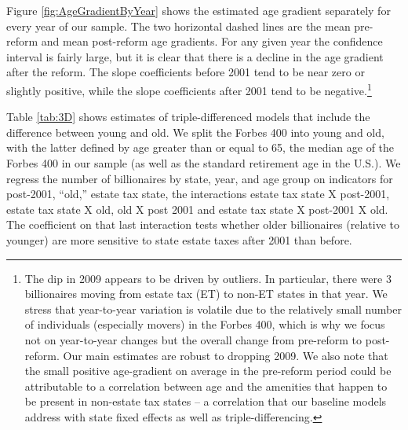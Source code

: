 \documentclass[12pt]{article}
\begin{document}
Figure \ref{fig:AgeGradientByYear} shows the estimated age gradient separately for every year of our sample. The two horizontal dashed lines are the mean pre-reform and mean post-reform age gradients.  
For any given year the confidence interval is fairly large, but it is clear that 
there is a decline in the age gradient after the reform. 
The slope coefficients before 2001 tend to be near zero or slightly positive, while the slope coefficients after 2001 tend to be negative.\footnote{The dip in 2009 appears to be driven by outliers. In particular, there were 3 billionaires moving from estate tax (ET) to non-ET states in that year. We stress that year-to-year variation is volatile due to the relatively small number of individuals (especially movers) in the Forbes 400, which is why we focus not on year-to-year changes but the overall change from pre-reform to post-reform.  Our main estimates are robust to dropping 2009. 
We also note that the small positive age-gradient on average in the pre-reform period could be attributable to a correlation between age and the amenities that happen to be present in non-estate tax states – a correlation that our baseline models address with state fixed effects as well as triple-differencing.} 


Table \ref{tab:3D} shows estimates of triple-differenced models that include the difference between young and old.  
We split the Forbes 400 into young and old, with the latter defined by age greater than or equal to 65, the median age of the Forbes 400 in our sample (as well as the standard retirement age in the U.S.). We regress the number of billionaires by state, year, and age group on indicators for post-2001, ``old,'' estate tax state, the interactions estate tax state X post-2001, estate tax state X old, old X post 2001 and estate tax state X post-2001 X old. The coefficient on that last interaction tests whether older billionaires (relative to younger) are more sensitive to state estate taxes after 2001 than before.
\end{document}
